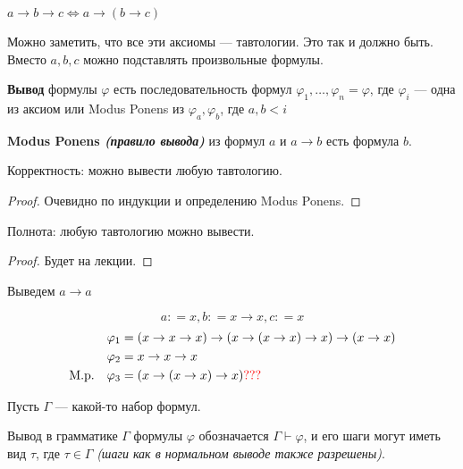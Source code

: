 \begin{remark}
    \(a \to b \to c \Leftrightarrow a \to (b \to c)\)
\end{remark}

Можно заметить, что все эти аксиомы --- тавтологии. Это так и должно быть. Вместо \(a, b, c\) можно подставлять произвольные формулы.

\begin{definition}
    \textbf{Вывод} формулы \(\varphi\) есть последовательность формул \(\varphi_1, \dots , \varphi_n = \varphi\), где \(\varphi_i\) --- одна из аксиом или Modus Ponens из \(\varphi_a, \varphi_b\), где \(a, b < i\)
\end{definition}

\begin{definition}
    \textbf{Modus Ponens \textit{(правило вывода)}} из формул \(a\) и \(a \to b\) есть формула \(b\).
\end{definition}

Корректность: можно вывести любую тавтологию.
\begin{proof}
    Очевидно по индукции и определению Modus Ponens.
\end{proof}

Полнота: любую тавтологию можно вывести.
\begin{proof}
    Будет на лекции.
\end{proof}

\begin{example}
    Выведем \(a \to a\)

    \[a: = x, b: = x \to x, c : = x\]
    \begin{align*}
        \varphi_1                   & = (x \to x \to x) \to (x \to (x \to x) \to x) \to (x \to x) \\
        \varphi_2                   & = x \to x \to x                                             \\
        \text{M.p.} \quad \varphi_3 & = (x \to (x \to x) \to x) \textcolor{red}{???}                                \\
    \end{align*}
\end{example}

Пусть \(\Gamma\) --- какой-то набор формул.

\begin{definition}
    Вывод в грамматике \(\Gamma\) формулы \(\varphi\) обозначается \(\Gamma \vdash \varphi\), и его шаги могут иметь вид \(\tau\), где \(\tau\in\Gamma\) \textit{(шаги как в нормальном выводе также разрешены)}.
\end{definition}

